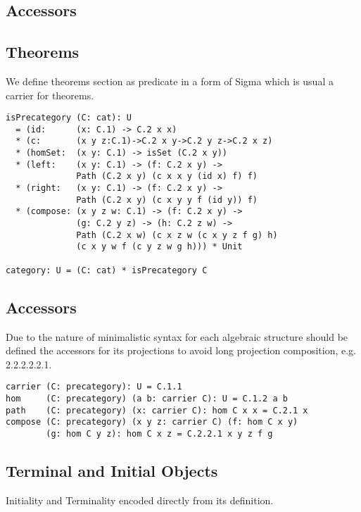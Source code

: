 \documentclass{article}
\begin{document}
\subsection{Accessors}

\subsection{Theorems}

We define theorems section as predicate in a form of Sigma
which is usual a carrier for theorems.

\begin{lstlisting}[mathescape=true]
isPrecategory (C: cat): U
  = (id:      (x: C.1) -> C.2 x x)
  * (c:       (x y z:C.1)->C.2 x y->C.2 y z->C.2 x z)
  * (homSet:  (x y: C.1) -> isSet (C.2 x y))
  * (left:    (x y: C.1) -> (f: C.2 x y) ->
              Path (C.2 x y) (c x x y (id x) f) f)
  * (right:   (x y: C.1) -> (f: C.2 x y) ->
              Path (C.2 x y) (c x y y f (id y)) f)
  * (compose: (x y z w: C.1) -> (f: C.2 x y) ->
              (g: C.2 y z) -> (h: C.2 z w) ->
              Path (C.2 x w) (c x z w (c x y z f g) h)
              (c x y w f (c y z w g h))) * Unit

category: U = (C: cat) * isPrecategory C
\end{lstlisting}

\subsection{Accessors}

Due to the nature of minimalistic syntax for each algebraic structure
should be defined the accessors for its projections to avoid long projection
composition, e.g. 2.2.2.2.2.1.

\begin{lstlisting}[mathescape=true]
carrier (C: precategory): U = C.1.1
hom     (C: precategory) (a b: carrier C): U = C.1.2 a b
path    (C: precategory) (x: carrier C): hom C x x = C.2.1 x
compose (C: precategory) (x y z: carrier C) (f: hom C x y)
        (g: hom C y z): hom C x z = C.2.2.1 x y z f g
\end{lstlisting}

\subsection{Terminal and Initial Objects}

Initiality and Terminality encoded directly from its definition.
\end{document}
